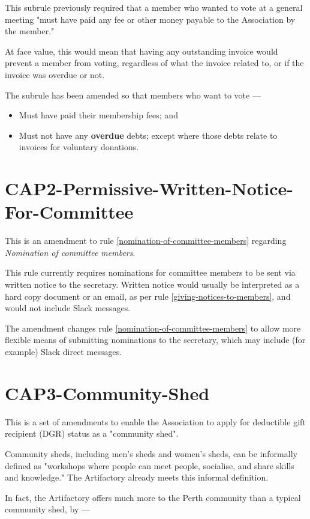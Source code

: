 \documentclass[../constitution.tex]{subfiles}
\begin{document}
This subrule previously required that a member who wanted to vote at a general meeting "must have paid any fee or other money payable to the Association by the member."

At face value, this would mean that having any outstanding invoice would prevent a member from voting, regardless of what the invoice related to, or if the invoice was overdue or not.

The subrule has been amended so that members who want to vote ---

\begin{itemize}
    \item Must have paid their membership fees; and
    \item Must not have any \textbf{overdue} debts; except where those debts relate to invoices for voluntary donations.
\end{itemize}

\section*{CAP2-Permissive-Written-Notice-For-Committee}

This is an amendment to rule \ref{nomination-of-committee-members} regarding \textit{Nomination of committee members}.

This rule currently requires nominations for committee members to be sent via written notice to the secretary. Written notice would usually be interpreted as a hard copy document or an email, as per rule \ref{giving-notices-to-members}, and would not include Slack messages.

The amendment changes rule \ref{nomination-of-committee-members} to allow more flexible means of submitting nominations to the secretary, which may include (for example) Slack direct messages.

\section*{CAP3-Community-Shed}

This is a set of amendments to enable the Association to apply for deductible gift recipient (DGR) status as a "community shed".

Community sheds, including men's sheds and women's sheds, can be informally defined as "workshops where people can meet people, socialise, and share skills and knowledge." The Artifactory already meets this informal definition.

In fact, the Artifactory offers much more to the Perth community than a typical community shed, by ---
\end{document}
